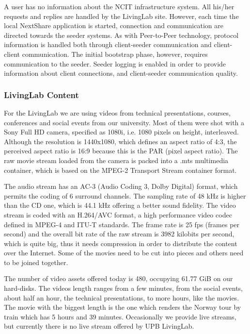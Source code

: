 A user has no information about the NCIT infrastructure system. All his/her
requests and replies are handled by the LivingLab site. However, each time
the local NextShare application is started, connection and communication are
directed towards the seeder systems. As with Peer-to-Peer technology, protocol
information is handled both through client-seeder communication and
client-client communication. The initial bootstrap phase, however, requires
communication to the seeder. Seeder logging is enabled in order to provide
information about client connections, and client-seeder communication quality.

\subsubsection{LivingLab Content}

For the LivingLab we are using videos from technical presentations, courses,
conferences and social events from our university. Most of them were shot with
a Sony Full HD camera, specified as 1080i, i.e. 1080 pixels on height,
interleaved. Although the resolution is 1440x1080, which defines an aspect
ratio of 4:3, the perceived aspect ratio is 16:9 because this is the PAR
(pixel aspect ratio). The raw movie stream loaded from the camera is packed
into a .mts multimedia container, which is based on the MPEG-2 Transport
Stream container format.

The audio stream has an AC-3 (Audio Coding 3, Dolby Digital) format, which
permits the coding of 6 surround channels. The sampling rate of 48 kHz is
higher than the CD one, which is 44.1 kHz offering a better sound fidelity.
The video stream is coded with an H.264/AVC format, a high performance video
codec defined in MPEG-4 and ITU-T standards.  The frame rate is 25 fps (frames
per second) and the overall bit rate of the raw stream is 3982 kilobits per
second, which is quite big, thus it needs compression in order to distribute
the content over the Internet. Some of the movies need to be cut into pieces
and others need to be joined together.

The number of video assets offered today is 480, occupying 61.77 GiB on our
hard-disks. The videos length ranges from a few minutes, from the social
events, about half an hour, the technical presentations, to more hours, like
the movies. The movie with the biggest length is the one which renders the
Norway tour by train which has 5 hours and 39 minutes. Occasionally we provide
live streams, but currently there is no live stream offered by UPB LivingLab.


